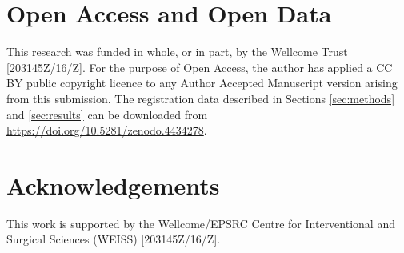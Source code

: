 \section{Open Access and Open Data}
This research was funded in whole, or in part, by the Wellcome Trust [203145Z/16/Z]. 
For the purpose of Open Access, the author has applied a CC BY public copyright licence to any Author Accepted Manuscript version arising from this submission.
The registration data described in Sections \ref{sec:methods} and \ref{sec:results} can be downloaded from \href{https://doi.org/10.5281/zenodo.4434278}{https://doi.org/10.5281/zenodo.4434278}.


\section{Acknowledgements}
This work is supported by the Wellcome/EPSRC Centre for Interventional and Surgical Sciences (WEISS) [203145Z/16/Z].


